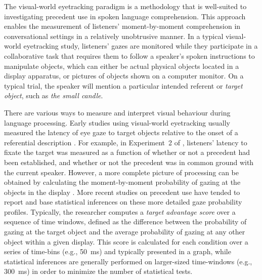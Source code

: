 \documentclass[doc,fignum,apacite,floatsintext]{apa6}
\begin{document}
The visual-world eyetracking paradigm \cite{cooper74,tanenhausetal95} is a methodology that is well-suited to investigating precedent use in spoken language comprehension.  This approach enables the measurement of listeners' moment-by-moment comprehension in conversational settings in a relatively unobtrusive manner.  In a typical visual-world eyetracking study, listeners' gazes are monitored while they participate in a collaborative task that requires them to follow a speaker's spoken instructions to manipulate objects, which can either be actual physical objects located in a display apparatus, or pictures of objects shown on a computer monitor.  On a typical trial, the speaker will mention a particular intended referent or \textit{target object}, such as \textit{the small candle}.  

There are various ways to measure and interpret visual behaviour during language processing.  Early studies using visual-world eyetracking usually measured the latency of eye gaze to target objects relative to the onset of a referential description \cite{altmannkamide99,keysaretal00,tanenhausetal95}.  For example, in Experiment~2 of , listeners' latency to fixate the target was measured as a function of whether or not a precedent had been established, and whether or not the precedent was in common ground with the current speaker.  However, a more complete picture of processing can be obtained by calculating the moment-by-moment probability of gazing at the objects in the display \cite{allopennamagnusontanenhaus98}.  More recent studies on precedent use have tended to report and base statistical inferences on these more detailed gaze probability profiles.  Typically, the researcher computes a \textit{target advantage score} over a sequence of time windows, defined as the difference between the probability of gazing at the target object and the average probability of gazing at any other object within a given display.  This score is calculated for each condition over a series of time-bins (e.g., 50~ms) and typically presented in a graph, while statistical inferences are generally performed on larger-sized time-windows (e.g., 300~ms) in order to minimize the number of statistical tests.
\end{document}
